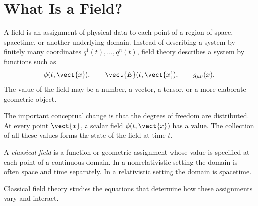 \section{What Is a Field?}

A field is an assignment of physical data to each point of a region of space,
spacetime, or another underlying domain. Instead of describing a system by
finitely many coordinates \(q^1(t),\ldots,q^n(t)\), field theory describes a
system by functions such as
\[
    \phi(t,\vect{x}), \qquad
    \vect{E}(t,\vect{x}), \qquad
    g_{\mu\nu}(x).
\]
The value of the field may be a number, a vector, a tensor, or a more elaborate
geometric object.

The important conceptual change is that the degrees of freedom are distributed.
At every point \(\vect{x}\), a scalar field \(\phi(t,\vect{x})\) has a value.
The collection of all these values forms the state of the field at time \(t\).

\begin{definitionbox}
A \emph{classical field} is a function or geometric assignment whose value is
specified at each point of a continuous domain. In a nonrelativistic setting the
domain is often space and time separately. In a relativistic setting the domain
is spacetime.
\end{definitionbox}

Classical field theory studies the equations that determine how these
assignments vary and interact.
